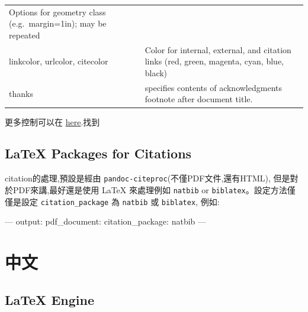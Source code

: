 \documentclass[]{book}
\newenvironment{Shaded}{\begin{snugshade}}{\end{snugshade}}
\newcommand{\AttributeTok}[1]{\textcolor[rgb]{0.77,0.63,0.00}{#1}}
\newcommand{\FunctionTok}[1]{\textcolor[rgb]{0.00,0.00,0.00}{#1}}
\newcommand{\OtherTok}[1]{\textcolor[rgb]{0.56,0.35,0.01}{#1}}
\theoremstyle{definition}
\theoremstyle{definition}
\theoremstyle{definition}
\theoremstyle{remark}
\begin{document}
\begin{longtable}[]{@{}ll@{}}
\begin{minipage}[t]{0.47\columnwidth}
Options for geometry class (e.g.~margin=1in); may be repeated\strut
\end{minipage}\tabularnewline
\begin{minipage}[t]{0.47\columnwidth}\raggedright
linkcolor, urlcolor, citecolor\strut
\end{minipage} & \begin{minipage}[t]{0.47\columnwidth}\raggedright
Color for internal, external, and citation links (red, green, magenta,
cyan, blue, black)\strut
\end{minipage}\tabularnewline
\begin{minipage}[t]{0.47\columnwidth}\raggedright
thanks\strut
\end{minipage} & \begin{minipage}[t]{0.47\columnwidth}\raggedright
specifies contents of acknowledgments footnote after document
title.\strut
\end{minipage}\tabularnewline
\bottomrule
\end{longtable}

更多控制可以在
\href{http://pandoc.org/MANUAL.html\#variables-for-latex}{here}.找到

\hypertarget{latex-packages-for-citations}{%
\subsection{LaTeX Packages for
Citations}\label{latex-packages-for-citations}}

citation的處理,預設是經由
\texttt{pandoc-citeproc}(不僅PDF文件,還有HTML),
但是對於PDF來講,最好還是使用 LaTeX 來處理例如 \texttt{natbib} or
\texttt{biblatex}。設定方法僅僅是設定 \texttt{citation\_package} 為
\texttt{natbib} 或 \texttt{biblatex}, 例如:

\begin{Shaded}
\begin{Highlighting}[]
\OtherTok{---}
\FunctionTok{output:}
  \FunctionTok{pdf_document:}
    \FunctionTok{citation_package:}\AttributeTok{ natbib}
\OtherTok{---}
\end{Highlighting}
\end{Shaded}

\section{中文}

\hypertarget{latex-engine}{%
\subsection{LaTeX Engine}\label{latex-engine}}
\end{document}
